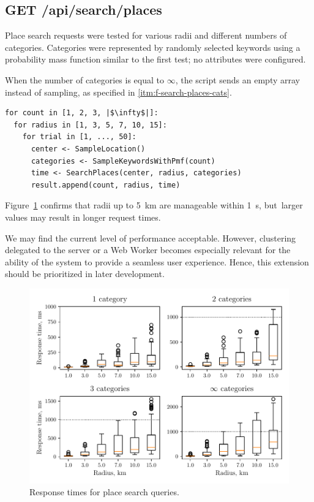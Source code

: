 \clearpage

\subsection*{GET /api/search/places}

Place search requests were tested for various radii and different numbers of categories. Categories were represented by randomly selected keywords using a probability mass function similar to the first test; no attributes were configured.

When the number of categories is equal to $\infty$, the script sends an empty array instead of sampling, as specified in \ref{itm:f-search-places-cats}.

\begin{verbatim}
for count in [1, 2, 3, |$\infty$|]:
  for radius in [1, 3, 5, 7, 10, 15]:
    for trial in [1, ..., 50]:
      center <- SampleLocation()
      categories <- SampleKeywordsWithPmf(count)
      time <- SearchPlaces(center, radius, categories)
      result.append(count, radius, time)
\end{verbatim}

Figure~\ref{fig:perf-search-places} confirms that radii up to 5~km are manageable within 1~s, but~larger values may result in longer request times.

We may find the current level of performance acceptable. However, clustering delegated to the server or a Web Worker becomes especially relevant for the ability of the system to provide a seamless user experience. Hence, this extension should be prioritized in later development.

\vspace{0.8em}

\begin{figure}[!h]
  \centering
  \includegraphics[width=\linewidth]{img/testing/perf-search-places.pdf}
  \caption{Response times for place search queries.}
  \label{fig:perf-search-places}
\end{figure}

